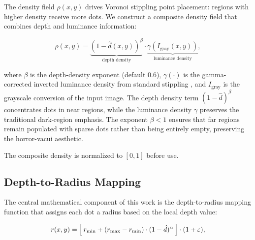 The density field $\rho(x,y)$ drives Voronoi stippling point placement:
regions with higher density receive more dots. We construct a composite
density field that combines depth and luminance information:

\begin{equation}
    \rho(x,y) = \underbrace{(1 - \hat{d}(x,y))^\beta}_{\text{depth density}} \cdot \underbrace{\gamma(I_{\text{gray}}(x,y))}_{\text{luminance density}},
    \label{eq:composite_density}
\end{equation}

\noindent where $\beta$ is the depth-density exponent (default 0.6),
$\gamma(\cdot)$ is the gamma-corrected inverted luminance density from
standard stippling \citep{secord2002weighted}, and $I_{\text{gray}}$ is
the grayscale conversion of the input image. The depth density term
$(1 - \hat{d})^\beta$ concentrates dots in near regions, while the
luminance density $\gamma$ preserves the traditional dark-region
emphasis. The exponent $\beta < 1$ ensures that far regions remain
populated with sparse dots rather than being entirely empty, preserving
the horror-vacui aesthetic.

The composite density is normalized to $[0, 1]$ before use.

\subsection{Depth-to-Radius Mapping}
\label{sec:method:radius}

The central mathematical component of this work is the
depth-to-radius mapping function that assigns each dot a radius based
on the local depth value:

\begin{equation}
    r(x,y) = \Bigl[\, r_{\min} + (r_{\max} - r_{\min}) \cdot (1 - \hat{d})^\alpha \,\Bigr] \cdot (1 + \varepsilon),
    \label{eq:radius_mapping}
\end{equation}

